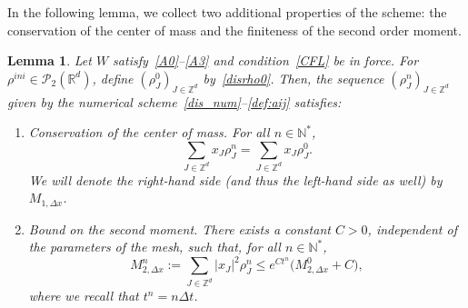 \documentclass[11pt]{article}
\newtheorem{lemm}[theo]{Lemma}
\theoremstyle{definition}
\numberwithin{equation}{section}
\newcommand*\NN{\mathbb{N}}
\newcommand*\RR{\mathbb{R}}
\newcommand*\ZZ{\mathbb{Z}}
\newcommand*\calP{{\mathcal P}}
\newcommand*\mIn{M_{1,\Delta x}}
\newcommand*{\romanenumi}{}%
\begin{document}
In the following lemma, we collect two additional properties of the scheme: the conservation of the center of mass and the finiteness of the second order moment.

\goodbreak
\begin{lemm}\label{bounddismom}
Let $W$ satisfy~\eqref{A0}--\eqref{A3} and condition~\eqref{CFL} be in force. For $\rho^{ini}\in \calP_2(\RR^d)$, define $(\rho_{J}^0)_{J\in \ZZ^d}$ by~\eqref{disrho0}. Then, the sequence $(\rho_{J}^n)_{J\in \ZZ^d}$ given by the numerical scheme~\eqref{dis_num}--\eqref{def:aij} satisfies:
\begin{enumerate}\romanenumi
\item \label{3.2.1} Conservation of the center of mass. For all $n\in \NN^*$,
\[
\sum_{J\in \ZZ^d} x_J \rho_{J}^n = \sum_{J\in \ZZ^d} x_J \rho_{J}^0.
\]
We will denote the right-hand side (and thus the left-hand side as well) by $\mIn{}$.

\item \label{3.2.2} Bound on the second moment. There exists a constant $C>0$, independent of the parameters of the mesh, such that, for all $n\in \NN^*$,
\begin{equation*}
M_{2,\Delta x}^n := \sum_{J\in \ZZ^d} |x_J|^2\rho_{J}^n \leq e^{C t^n} \big(M_{2,\Delta x}^0 + C\big),
\end{equation*}
where we recall that $t^n=n\Delta t$.
\end{enumerate}
\end{lemm}
\end{document}
